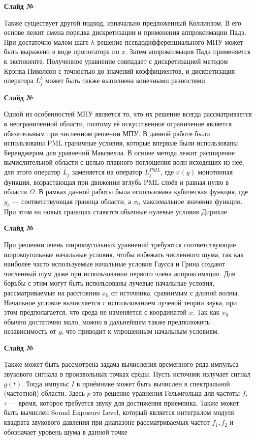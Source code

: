 \documentclass{fefu}
\newcounter{slide}
\newcommand{\slide}{\stepcounter{slide}\par\noindent\textbf{Слайд №\theslide}\par\noindent}
\newcommand{\pa}[1]{\left(#1\right)}
\begin{document}
    \slide
    Также существует другой подход, изначально предложенный Коллинзом. В его основе лежит смена порядка дискретизации и применения аппроксимации Падэ. При достаточно малом шаге $h$ решение псевдодифференциального МПУ может быть выражено в виде пропогатора по $x$. Затем аппроксимация Падэ применяется к экспоненте. Полученное уравнение совпадает с дискретизацией методом Крэнка-Николсон с точностью до значений коэффициентов, и дискретизация оператора $L_j^\delta$ может быть также выполнена конечными разностями
    \slide
    Одной из особенностей МПУ является то, что их решение всегда рассмат­ривается в неограниченной области, поэтому её искусственное ограничение является обязательным при численном решении МПУ. В данной работе были использованы PML граничные условия, которые впервые были использованы Беренджером для уравнений Максвелла. В основе метода лежит расширение вычислительной области с целью плавного поглощения волн исходящих из неё, для этого оператор $L_j$ заменяется на оператор $L_j^{PML}$, где $\sigma\pa{y}$ монотонная функция, возрастающая при движении вглубь PML слоёв и равная нулю в области $\Omega$. В рамках данной работы была использована кубическая функция, где $y_b$ --- соответствующая граница области, а $\sigma_0$ максимальное значение функции. При этом на новых границах ставятся обычные нулевые условия Дирихле
    \slide
    При решении очень широкоугольных уравнений требуются соответствующие широкоугольные начальные условия, чтобы избежать численного шума, так как наиболее часто используемые начальные условия Гаусса и Грина создают численный шум даже при использовании первого члена аппроксимации. Для борьбы с этим могут быть использованы лучевые начальные условия, рассматриваемые на расстоянии $x_0$ от источника, сравнимым с длиной волны. Начальное условие вычисляется с использованием лучевой теории звука, при этом предполагается, что среда не изменяется с координатой $x$. Так как $x_0$ обычно достаточно мало, можно в дальнейшем также предположить независимость от $y$, что приводит к упрошенным начальным условиям. 
    \slide
    Также может быть рассмотрена задача вычисления временного ряда импульса звукового сигнала в произвольных точках среды. Пусть источник излучает сигнал $g\pa{t}$. Тогда импульс $I$ в приёмнике может быть вычислен в спектральной (частотной) области. Здесь $p$ это решение уравнения Гельмгольца для частоты $f$, $\tau$ --- время, которое требуется звуку для достижения приёмника. Также может быть вычислен Sound Exposure Level, который является интегралом модуля квадрата звукового давления при диапазоне рассматриваемых частот $f_1, f_2$ и обозначает уровень шума в данной точке
\end{document}
